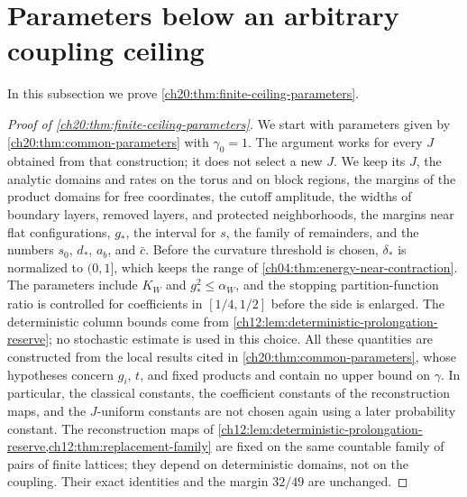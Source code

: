 \section{Parameters below an arbitrary coupling ceiling}\label{ch20:sec:finite-ceiling}

In this subsection we prove \cref{ch20:thm:finite-ceiling-parameters}.

\begin{proof}[Proof of \cref{ch20:thm:finite-ceiling-parameters}]
We start with parameters given by \cref{ch20:thm:common-parameters} with $\gamma_0=1$. The argument works for every $J$ obtained from that construction; it does not select a new $J$. We keep its $J$, the analytic domains and rates on the torus and on block regions, the margins of the product domains for free coordinates, the cutoff amplitude, the widths of boundary layers, removed layers, and protected neighborhoods, the margins near flat configurations, $g_*$, the interval for $s$, the family of remainders, and the numbers $s_0$, $d_*$, $a_b$, and $\bar c$. Before the curvature threshold is chosen, $\delta_*$ is normalized to $(0,1]$, which keeps the range of \cref{ch04:thm:energy-near-contraction}. The parameters include $K_W$ and $g_*^2\le\alpha_W$, and the stopping partition-function ratio is controlled for coefficients in $[1/4,1/2]$ before the side is enlarged. The deterministic column bounds come from \cref{ch12:lem:deterministic-prolongation-reserve}; no stochastic estimate is used in this choice. All these quantities are constructed from the local results cited in \cref{ch20:thm:common-parameters}, whose hypotheses concern $g_i$, $t$, and fixed products and contain no upper bound on $\gamma$. In particular, the classical constants, the coefficient constants of the reconstruction maps, and the $J$-uniform constants are not chosen again using a later probability constant. The reconstruction maps of \cref{ch12:lem:deterministic-prolongation-reserve,ch12:thm:replacement-family} are fixed on the same countable family of pairs of finite lattices; they depend on deterministic domains, not on the coupling. Their exact identities and the margin $32/49$ are unchanged.


\end{proof}

